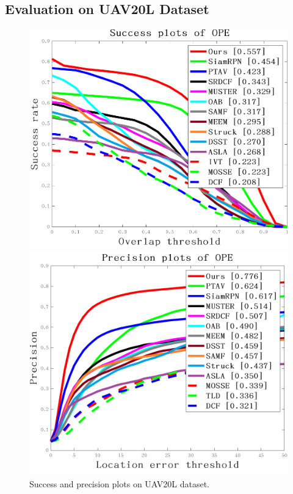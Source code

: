 \subsection{Evaluation on UAV20L Dataset}

\begin{figure}[htb]
\begin{minipage}[b]{0.5\linewidth}
  \centering
  \centerline{\includegraphics[width=1.0\textwidth]{Img/globally/UAV20L/quality_plot_overlap_OPE_AUC.png}}
\end{minipage}
\hfill
\begin{minipage}[b]{0.5\linewidth}
  \centering
  \centerline{\includegraphics[width=1.0\textwidth]{Img/globally/UAV20L/quality_plot_error_OPE_threshold.png}}
\end{minipage}
%
\caption{Success and precision plots on UAV20L dataset.}
\label{fig:uav20l}
%
\end{figure}

